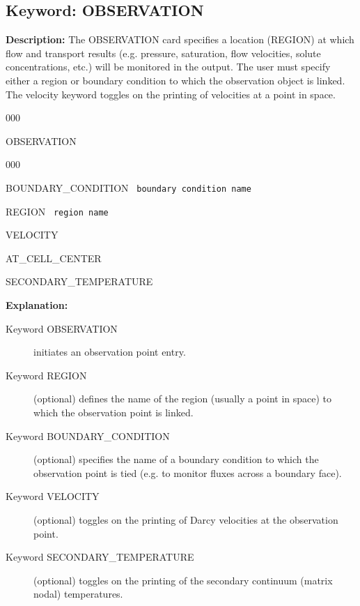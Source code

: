 \documentclass[12pt]{article}
\begin{document}

\newpage
\protect\hypertarget{target_observation}{}

\subsection{Keyword: OBSERVATION}

{\noindent\bf Description:}
The OBSERVATION card specifies a location (REGION) at which flow and transport results (e.g. pressure, saturation, flow velocities, solute concentrations, etc.) will be monitored in the output.
The user must specify either a region or boundary condition to which the observation object is linked.  The velocity keyword toggles on the printing of velocities at a point in space.

\begin{deflist}{000}
\item[OBSERVATION] ~
\begin{deflist}{000}
\item[BOUNDARY\_CONDITION] \ {\tt boundary condition name}
\item[REGION] \ {\tt region name}
\item[VELOCITY]
\item[AT\_CELL\_CENTER]
\item[SECONDARY\_TEMPERATURE]
\end{deflist}
\item[\keyend]
\end{deflist}

{\noindent\bf Explanation:}
\begin{description}
\item[Keyword OBSERVATION] initiates an observation point entry.
\item[Keyword REGION] (optional) defines the name of the region (usually a point in space) to which the observation point is linked.
\item[Keyword BOUNDARY\_CONDITION] (optional) specifies the name of a boundary condition to which the observation point is tied (e.g. to monitor fluxes across a boundary face).
\item[Keyword VELOCITY] (optional) toggles on the printing of Darcy velocities at the observation point.
\item[Keyword SECONDARY\_TEMPERATURE] (optional) toggles on the printing of the secondary continuum (matrix nodal) temperatures.
\end{description}
\end{document}
